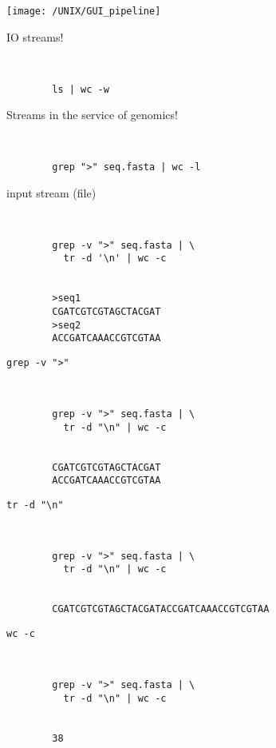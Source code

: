 \documentclass[xcolor=dvipsnames]{beamer}
\begin{document}
\begin{frame}
	\begin{center}
		\texttt{[image: /UNIX/GUI\_pipeline]}
	\end{center}
\end{frame}

\begin{frame}[fragile]
	\huge
	IO streams!
	\Large
	\begin{verbatim}
		
	
		ls | wc -w
	\end{verbatim}
\end{frame}

\begin{frame}[fragile]
	\huge
	Streams in the service of genomics!
	\Large
	\begin{verbatim}
		
	
		grep ">" seq.fasta | wc -l
	\end{verbatim}
\end{frame}

\begin{frame}[fragile]
	\huge
	input stream (file)
	\Large
	\begin{verbatim}
		
	
		grep -v ">" seq.fasta | \
		  tr -d '\n' | wc -c
		
		
		>seq1
		CGATCGTCGTAGCTACGAT
		>seq2
		ACCGATCAAACCGTCGTAA
	\end{verbatim}
\end{frame}

\begin{frame}[fragile]
	\huge
	\verb!grep -v ">"!
	\Large
	\begin{verbatim}
		
	
		grep -v ">" seq.fasta | \
		  tr -d "\n" | wc -c
		
		
		CGATCGTCGTAGCTACGAT
		ACCGATCAAACCGTCGTAA
	\end{verbatim}
\end{frame}

\begin{frame}[fragile]
	\huge
	\verb!tr -d "\n"!
	\Large
	\begin{verbatim}
		
	
		grep -v ">" seq.fasta | \
		  tr -d "\n" | wc -c
		
		
		CGATCGTCGTAGCTACGATACCGATCAAACCGTCGTAA
	\end{verbatim}
\end{frame}

\begin{frame}[fragile]
	\huge
	\verb!wc -c!
	\Large
	\begin{verbatim}
		
	
		grep -v ">" seq.fasta | \
		  tr -d "\n" | wc -c
		
		
		38
	\end{verbatim}
\end{frame}
\end{document}

